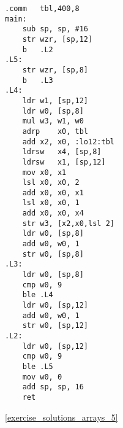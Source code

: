 \begin{lstlisting}[caption=\NonOptimizing GCC 4.9 (ARM64)]
	.comm	tbl,400,8
main:
	sub	sp, sp, #16
	str	wzr, [sp,12]
	b	.L2
.L5:
	str	wzr, [sp,8]
	b	.L3
.L4:
	ldr	w1, [sp,12]
	ldr	w0, [sp,8]
	mul	w3, w1, w0
	adrp	x0, tbl
	add	x2, x0, :lo12:tbl
	ldrsw	x4, [sp,8]
	ldrsw	x1, [sp,12]
	mov	x0, x1
	lsl	x0, x0, 2
	add	x0, x0, x1
	lsl	x0, x0, 1
	add	x0, x0, x4
	str	w3, [x2,x0,lsl 2]
	ldr	w0, [sp,8]
	add	w0, w0, 1
	str	w0, [sp,8]
.L3:
	ldr	w0, [sp,8]
	cmp	w0, 9
	ble	.L4
	ldr	w0, [sp,12]
	add	w0, w0, 1
	str	w0, [sp,12]
.L2:
	ldr	w0, [sp,12]
	cmp	w0, 9
	ble	.L5
	mov	w0, 0
	add	sp, sp, 16
	ret
\end{lstlisting}



\Answer\: \ref{exercise_solutions_arrays_5}
